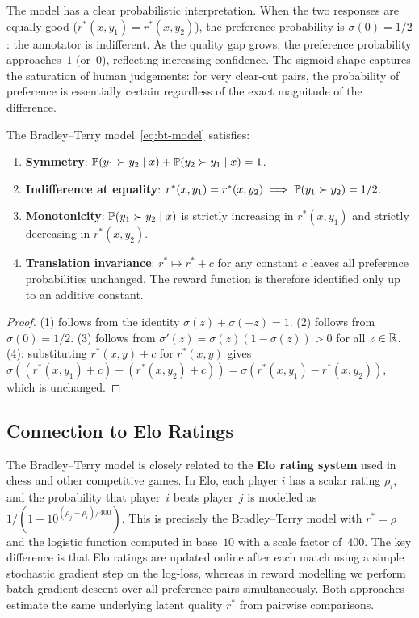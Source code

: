 The model has a clear probabilistic interpretation. When the two responses are equally good ($r^*(x,y_1) = r^*(x,y_2)$), the preference probability is $\sigma(0) = 1/2$: the annotator is indifferent. As the quality gap grows, the preference probability approaches~$1$ (or~$0$), reflecting increasing confidence. The sigmoid shape captures the saturation of human judgements: for very clear-cut pairs, the probability of preference is essentially certain regardless of the exact magnitude of the difference.

\begin{proposition}
\label{prop:bt-properties}
The Bradley--Terry model~\eqref{eq:bt-model} satisfies:
\begin{enumerate}
  \item \textbf{Symmetry}: $\mathbb{P}(y_1 \succ y_2 \mid x) + \mathbb{P}(y_2 \succ y_1 \mid x) = 1$.
  \item \textbf{Indifference at equality}: $r^*(x,y_1) = r^*(x,y_2) \implies \mathbb{P}(y_1 \succ y_2) = 1/2$.
  \item \textbf{Monotonicity}: $\mathbb{P}(y_1 \succ y_2 \mid x)$ is strictly increasing in $r^*(x,y_1)$ and strictly decreasing in $r^*(x,y_2)$.
  \item \textbf{Translation invariance}: $r^* \mapsto r^* + c$ for any constant $c$ leaves all preference probabilities unchanged. The reward function is therefore identified only up to an additive constant.
\end{enumerate}
\end{proposition}

\begin{proof}
(1) follows from the identity $\sigma(z) + \sigma(-z) = 1$. (2) follows from $\sigma(0) = 1/2$. (3) follows from $\sigma'(z) = \sigma(z)(1-\sigma(z)) > 0$ for all $z\in\mathbb{R}$. (4): substituting $r^*(x,y) + c$ for $r^*(x,y)$ gives $\sigma((r^*(x,y_1)+c) - (r^*(x,y_2)+c)) = \sigma(r^*(x,y_1)-r^*(x,y_2))$, which is unchanged.
\end{proof}

\subsection{Connection to Elo Ratings}

The Bradley--Terry model is closely related to the \textbf{Elo rating system} used in chess and other competitive games. In Elo, each player $i$ has a scalar rating $\rho_i$, and the probability that player~$i$ beats player~$j$ is modelled as $1/(1 + 10^{(\rho_j - \rho_i)/400})$. This is precisely the Bradley--Terry model with $r^* = \rho$ and the logistic function computed in base~$10$ with a scale factor of~$400$. The key difference is that Elo ratings are updated online after each match using a simple stochastic gradient step on the log-loss, whereas in reward modelling we perform batch gradient descent over all preference pairs simultaneously. Both approaches estimate the same underlying latent quality $r^*$ from pairwise comparisons.

